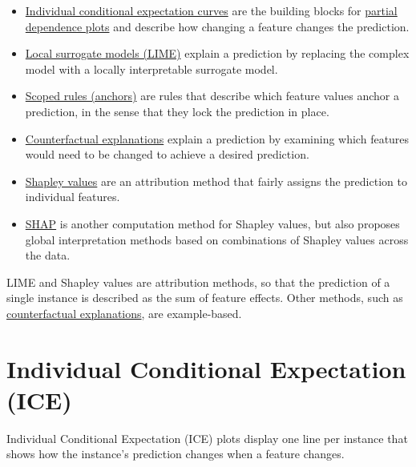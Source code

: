 \documentclass[
  10pt,
]{scrbook}
\providecommand{\tightlist}{%
  \setlength{\itemsep}{0pt}\setlength{\parskip}{0pt}}
\begin{document}
\begin{itemize}
\tightlist
\item
  \protect\hyperlink{ice}{Individual conditional expectation curves} are the building blocks for \protect\hyperlink{pdp}{partial dependence plots} and describe how changing a feature changes the prediction.
\item
  \protect\hyperlink{lime}{Local surrogate models (LIME)} explain a prediction by replacing the complex model with a locally interpretable surrogate model.
\item
  \protect\hyperlink{anchors}{Scoped rules (anchors)} are rules that describe which feature values anchor a prediction, in the sense that they lock the prediction in place.
\item
  \protect\hyperlink{counterfactual}{Counterfactual explanations} explain a prediction by examining which features would need to be changed to achieve a desired prediction.
\item
  \protect\hyperlink{shapley}{Shapley values} are an attribution method that fairly assigns the prediction to individual features.
\item
  \protect\hyperlink{shap}{SHAP} is another computation method for Shapley values, but also proposes global interpretation methods based on combinations of Shapley values across the data.
\end{itemize}

LIME and Shapley values are attribution methods, so that the prediction of a single instance is described as the sum of feature effects.
Other methods, such as \protect\hyperlink{counterfactual}{counterfactual explanations}, are example-based.

\newpage

\hypertarget{ice}{%
\section{Individual Conditional Expectation (ICE)}\label{ice}}

Individual Conditional Expectation (ICE) plots display one line per instance that shows how the instance's prediction changes when a feature changes.
\end{document}
